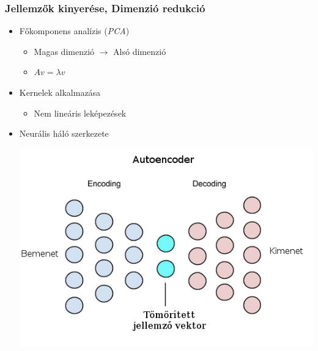 \documentclass{beamer}
\begin{document}
\begin{frame}[fragile]
\frametitle{Jellemzők kinyerése, Dimenzió redukció}

\begin{itemize}
\item Főkomponens analízis (\textit{PCA})
	\begin{itemize}
		\item Magas dimenzió $\rightarrow$ Alsó dimenzió
		\item \(Av = \lambda v\)
	\end{itemize}
\item Kernelek alkalmazása
	\begin{itemize}
		\item Nem lineáris leképezések
	\end{itemize}
\item Neurális háló szerkezete\\
	\begin{center}
		\includegraphics[scale=0.3]{deep_autoencoder}
	\end{center}
\end{itemize}

\end{frame}
\end{document}
